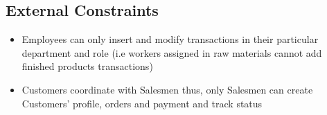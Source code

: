 \subsection{External Constraints}
\begin{itemize}
\item Employees can only insert and modify transactions in their particular department and role (i.e workers assigned in raw materials cannot add finished products transactions)
\item Customers coordinate with Salesmen thus, only Salesmen can create Customers' profile, orders and payment and track status
\end{itemize}